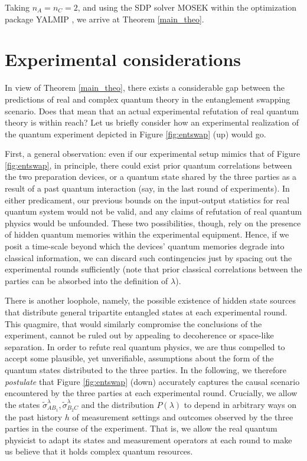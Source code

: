 \documentclass[onecolumn,prx,amsmath,amssymb]{revtex4-2}
\begin{document}
\begin{appendix}
Taking $n_A=n_C=2$, and using the SDP solver MOSEK \cite{mosek} within the optimization package YALMIP \cite{yalmip}, we arrive at Theorem \ref{main_theo}.



\section{Experimental considerations}
\label{sec:experimental}

In view of Theorem \ref{main_theo}, there exists a considerable gap between the predictions of real and complex quantum theory in the entanglement swapping scenario. Does that mean that an actual experimental refutation of real quantum theory is within reach? Let us briefly consider how an experimental realization of the quantum experiment depicted in Figure \ref{fig:entswap} (up) would go. 

First, a general observation: even if our experimental setup mimics that of Figure \ref{fig:entswap}, in principle, there could exist prior quantum correlations between the two preparation devices, or a quantum state shared by the three parties as a result of a past quantum interaction (say, in the last round of experiments). In either predicament, our previous bounds on the input-output statistics for real quantum system would not be valid, and any claims of refutation of real quantum physics would be unfounded. These two possibilities, though, rely on the presence of hidden quantum memories within the experimental equipment. Hence, if we posit a time-scale beyond which the devices' quantum memories degrade into classical information, we can discard such contingencies just by spacing out the experimental rounds sufficiently (note that prior classical correlations between the parties can be absorbed into the definition of $\lambda$). 

There is another loophole, namely, the possible existence of hidden state sources that distribute general tripartite entangled states at each experimental round. This quagmire, that would similarly compromise the conclusions of the experiment, cannot be ruled out by appealing to decoherence or space-like separation. In order to refute real quantum physics, we are thus compelled to accept some plausible, yet unverifiable, assumptions about the form of the quantum states distributed to the three parties. In the following, we therefore \emph{postulate} that Figure \ref{fig:entswap} (down) accurately captures the causal scenario encountered by the three parties at each experimental round. Crucially, we allow the states $\tilde{\sigma}_{AB_1}^{\lambda}, \tilde{\sigma}_{B_2C}^\lambda$ and the distribution $P(\lambda)$ to depend in arbitrary ways on the past history $h$ of measurement settings and outcomes observed by the three parties in the course of the experiment. That is, we allow the real quantum physicist to adapt its states and measurement operators at each round to make us believe that it holds complex quantum resources.


\end{appendix}
\end{document}
